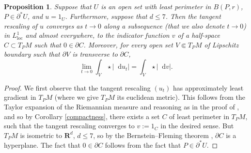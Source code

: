 \documentclass[reqno,11pt]{amsart}
\newcommand{\RR}{\mathbf{R}}
\newcommand*\dif{\mathop{}\!\mathrm{d}}
\newcommand{\loc}{\mathrm{loc}}
\newcommand{\cpt}{\mathrm{cpt}}
\newtheorem{proposition}[theorem]{Proposition}
\theoremstyle{definition}
\numberwithin{equation}{section}
\begin{document}
\begin{proposition}\label{blowup theorem}
Suppose that $U$ is an open set with least perimeter in $B(P, r)$, $P \in \partial^* U$, and $u = 1_U$.
Furthermore, suppose that $d \leq 7$.
Then the tangent rescaling of $u$ converges as $t \to 0$ along a subsequence (that we also denote $t \to 0$) in $L^1_\loc$ and almost everywhere, to the indicator function $v$ of a half-space $C \subset T_PM$ such that $0 \in \partial C$.
Moreover, for every open set $V \Subset T_PM$ of Lipschitz boundary such that $\partial V$ is transverse to $\partial C$,
$$\lim_{t \to 0} \int_V \star |\dif u_t| = \int_V \star |\dif v|.$$
\end{proposition}
\begin{proof}
We first observe that the tangent rescaling $(u_t)$ has approximately least gradient in $T_PM$ (where we give $T_PM$ its euclidean metric).
This follows from the Taylor expansion of the Riemannian measure and reasoning as in the proof of \cite[Theorem 9.3]{Giusti77}, and so by Corollary \ref{compactness}, there exists a set $C$ of least perimeter in $T_PM$, such that the tangent rescaling converges to $v := 1_C$ in the desired sense.
But $T_PM$ is isometric to $\RR^d$, $d \leq 7$, so by the Bernstein--Fleming theorem \cite[Theorem 17.3]{Giusti77}, $\partial C$ is a hyperplane.
The fact that $0 \in \partial C$ follows from the fact that $P \in \partial^* U$.
\end{proof}
\end{document}
